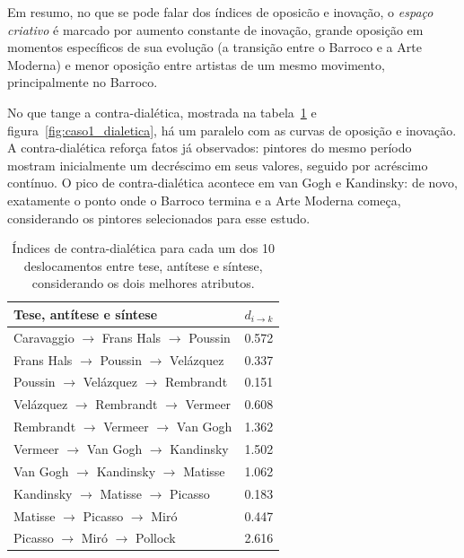 Em resumo, no que se pode falar dos índices de oposicão e
inovação, o \textit{espaço criativo} é marcado por aumento constante
de inovação, grande oposição em momentos específicos de sua evolução
(a transição entre o Barroco e a Arte Moderna) e menor oposição entre
artistas de um mesmo movimento, principalmente no Barroco.

No que tange a contra-dialética, mostrada na
tabela~\ref{tab:dialetica1} e figura~\ref{fig:caso1_dialetica}, há um
paralelo com as curvas de oposição e inovação. A contra-dialética
reforça fatos já observados: pintores do mesmo período mostram
inicialmente um decréscimo em seus valores, seguido por acréscimo
contínuo. O pico de contra-dialética acontece em van Gogh e Kandinsky:
de novo, exatamente o ponto onde o Barroco termina e a Arte Moderna
começa, considerando os pintores selecionados para esse estudo.

\begin{table}[ht]
  \begin{center}
  \caption{\label{tab:dialetica1} Índices de contra-dialética para cada um dos
    10 deslocamentos entre tese, antítese e síntese, considerando os dois
    melhores atributos.}
\begin{tabular}{@{}ll}
  
    \hline \hline
    Tese, antítese e síntese & $d_{i \rightarrow k}$ \\
    \hline
    Caravaggio $\to$ Frans Hals $\to$ Poussin   & 0.572 \\
    Frans Hals $\to$ Poussin $\to$ Vel\'{a}zquez & 0.337 \\
    Poussin $\to$ Vel\'{a}zquez $\to$ Rembrandt  & 0.151 \\
    Vel\'{a}zquez $\to$ Rembrandt $\to$ Vermeer  & 0.608 \\
    Rembrandt $\to$ Vermeer $\to$ Van Gogh      & 1.362 \\
    Vermeer $\to$ Van Gogh $\to$ Kandinsky      & 1.502 \\
    Van Gogh $\to$ Kandinsky $\to$ Matisse      & 1.062 \\
    Kandinsky $\to$ Matisse $\to$ Picasso       & 0.183 \\
    Matisse $\to$ Picasso $\to$ Mir\'{o}         & 0.447 \\
    Picasso $\to$ Mir\'{o} $\to$ Pollock         & 2.616 \\
    \hline \hline
  \end{tabular}
  \fonteminha
\end{center}
\end{table}


